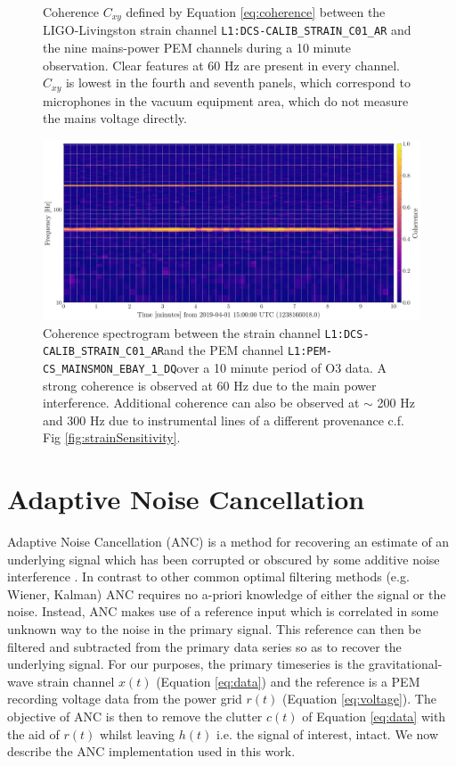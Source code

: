 \documentclass[pra,superscriptaddress,reprint,amsmath,amssymb,nofootinbib]{revtex4-2}
\newcommand{\StrainChanName}{\texttt{L1:DCS-CALIB\_STRAIN\_C01\_AR}}
\newcommand{\PEMChanName}{\texttt{L1:PEM-CS\_MAINSMON\_EBAY\_1\_DQ}}
\begin{document}
\begin{figure}
\begin{center}
	\end{center}
	\label{correlation_2}
	\caption{Coherence $C_{xy}$ defined by Equation \ref{eq:coherence} between the LIGO-Livingston strain channel  \texttt{L1:DCS-CALIB\_STRAIN\_C01\_AR} and the nine mains-power PEM channels during a 10 minute observation. Clear features at 60 Hz are present in every channel. $C_{xy}$ is lowest in the fourth and seventh panels, which correspond to microphones in the vacuum equipment area, which do not measure the mains voltage directly.}
\end{figure}
\begin{figure}
	\begin{center}
		\includegraphics[width=\textwidth]{images/coherence_spectrogram}
	\end{center}
	\caption{\label{correlation_1}
		Coherence spectrogram between the strain channel \StrainChanName  and the PEM channel \PEMChanName  	over a 10 minute period of O3 data. A strong coherence is observed at 60 Hz due to the main power interference. Additional coherence can also be observed at $\sim$ 200 Hz and 300 Hz due to instrumental lines of a different provenance c.f. Fig \ref{fig:strainSensitivity}.}
\end{figure}



\section{Adaptive Noise Cancellation}\label{sec:method}


Adaptive Noise Cancellation (ANC) is a method for recovering an estimate of an underlying signal which has been corrupted or obscured by some additive noise interference \cite{Widrow1451965}. In contrast to other common optimal filtering methods (e.g. Wiener, Kalman) ANC requires no a-priori knowledge of either the signal or the noise. Instead, ANC makes use of a reference input which is correlated in some unknown way to the noise in the primary signal. This reference  can then be filtered and subtracted from the primary data series so as to recover the underlying signal. For our purposes, the primary timeseries is the gravitational-wave strain channel $x(t)$ (Equation \eqref{eq:data}) and the reference is a PEM recording voltage data from the power grid $r(t)$ (Equation \eqref{eq:voltage}). The objective of ANC is then to remove the clutter $c(t)$ of Equation \eqref{eq:data} with the aid of $r(t)$ whilst leaving $h(t)$ i.e. the signal of interest, intact. We now describe the ANC implementation used in this work. \newline 
\end{document}

